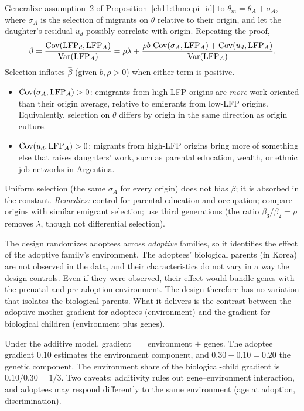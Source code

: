 \documentclass[../solutions_manual.tex]{subfiles}
\begin{document}
 Generalize assumption~2 of Proposition~\ref{ch11:thm:epi_id} to $\theta_m = \theta_A + \sigma_A$, where $\sigma_A$ is the selection of migrants on $\theta$ relative to their origin, and let the daughter's residual $u_d$ possibly correlate with origin. Repeating the proof,
\[
\beta = \frac{\operatorname{Cov}(\text{LFP}_d, \text{LFP}_A)}{\operatorname{Var}(\text{LFP}_A)} = \rho\lambda + \frac{\rho b\,\operatorname{Cov}(\sigma_A, \text{LFP}_A) + \operatorname{Cov}(u_d, \text{LFP}_A)}{\operatorname{Var}(\text{LFP}_A)} .
\]
Selection inflates $\hat\beta$ (given $b, \rho > 0$) when either term is positive.
\begin{itemize}
\item $\operatorname{Cov}(\sigma_A, \text{LFP}_A) > 0$: emigrants from high-LFP origins are \emph{more} work-oriented than their origin average, relative to emigrants from low-LFP origins. Equivalently, selection on $\theta$ differs by origin in the same direction as origin culture.
\item $\operatorname{Cov}(u_d, \text{LFP}_A) > 0$: migrants from high-LFP origins bring more of something else that raises daughters' work, such as parental education, wealth, or ethnic job networks in Argentina.
\end{itemize}
Uniform selection (the same $\sigma_A$ for every origin) does not bias $\beta$; it is absorbed in the constant. \textit{Remedies:} control for parental education and occupation; compare origins with similar emigrant selection; use third generations (the ratio $\beta_3/\beta_2 = \rho$ removes $\lambda$, though not differential selection).

 The design randomizes adoptees across \emph{adoptive} families, so it identifies the effect of the adoptive family's environment. The adoptees' biological parents (in Korea) are not observed in the data, and their characteristics do not vary in a way the design controls. Even if they were observed, their effect would bundle genes with the prenatal and pre-adoption environment. The design therefore has no variation that isolates the biological parents. What it delivers is the contrast between the adoptive-mother gradient for adoptees (environment) and the gradient for biological children (environment plus genes).

 Under the additive model, gradient $=$ environment $+$ genes. The adoptee gradient $0.10$ estimates the environment component, and $0.30 - 0.10 = 0.20$ the genetic component. The environment share of the biological-child gradient is $0.10/0.30 = 1/3$. Two caveats: additivity rules out gene--environment interaction, and adoptees may respond differently to the same environment (age at adoption, discrimination).
\end{document}

